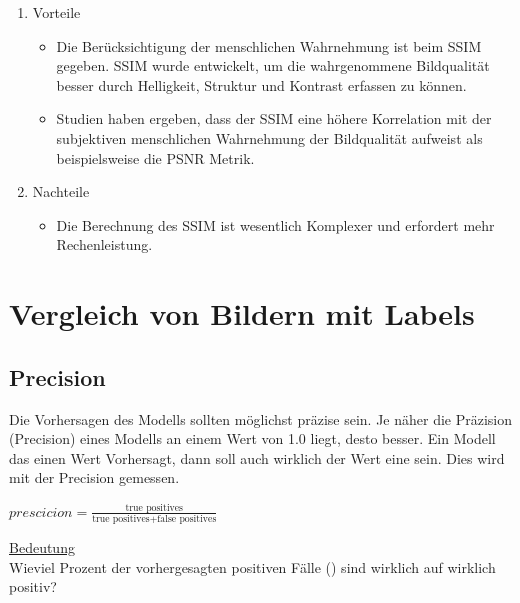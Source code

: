             \begin{enumerate}
                \item Vorteile
                \begin{itemize}
                    \item Die Berücksichtigung der menschlichen Wahrnehmung ist beim SSIM gegeben. SSIM wurde entwickelt, um die wahrgenommene Bildqualität besser durch Helligkeit, Struktur und Kontrast erfassen zu können.
                    \cite{wikipedia_ssim}
                    \item Studien haben ergeben, dass der SSIM eine höhere Korrelation mit der subjektiven menschlichen Wahrnehmung der Bildqualität aufweist als beispielsweise die PSNR Metrik.\cite{wikipedia_ssim}
                \end{itemize}
                \item Nachteile
                \begin{itemize}
                    \item Die Berechnung des SSIM ist wesentlich Komplexer und erfordert mehr Rechenleistung.
                \end{itemize}
            \end{enumerate}    

\newpage
    \section{Vergleich von Bildern mit Labels}
        \subsection{Precision}
            Die Vorhersagen des Modells sollten möglichst präzise sein. Je näher die Präzision (Precision) eines Modells an einem Wert von 1.0 liegt, desto besser.
            Ein Modell das einen Wert  Vorhersagt, dann soll auch wirklich der Wert eine  sein.
            Dies wird mit der Precision gemessen.\newline
            \begin{center}  
                \large$prescicion = \frac{\text{true positives}}{\text{true positives} + \text{false positives}}$\\
            \end{center}
            \underline{Bedeutung}\\
            Wieviel Prozent der vorhergesagten positiven Fälle () sind wirklich auf wirklich positiv?


